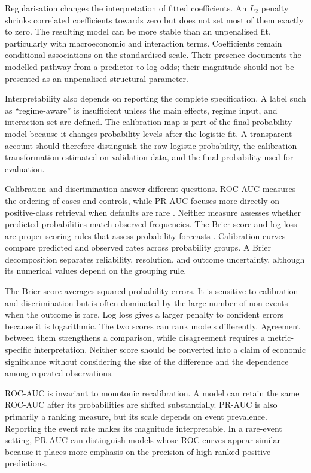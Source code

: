 Regularisation changes the interpretation of fitted coefficients. An $L_2$ penalty shrinks correlated coefficients towards zero but does not set most of them exactly to zero. The resulting model can be more stable than an unpenalised fit, particularly with macroeconomic and interaction terms. Coefficients remain conditional associations on the standardised scale. Their presence documents the modelled pathway from a predictor to log-odds; their magnitude should not be presented as an unpenalised structural parameter.

Interpretability also depends on reporting the complete specification. A label such as ``regime-aware'' is insufficient unless the main effects, regime input, and interaction set are defined. The calibration map is part of the final probability model because it changes probability levels after the logistic fit. A transparent account should therefore distinguish the raw logistic probability, the calibration transformation estimated on validation data, and the final probability used for evaluation.

Calibration and discrimination answer different questions. ROC-AUC measures the ordering of cases and controls, while PR-AUC focuses more directly on positive-class retrieval when defaults are rare \citep{davis_goadrich_2006,saito2015prroc}. Neither measure assesses whether predicted probabilities match observed frequencies. The Brier score and log loss are proper scoring rules that assess probability forecasts \citep{brier1950,gneiting_raftery_2007}. Calibration curves compare predicted and observed rates across probability groups. A Brier decomposition separates reliability, resolution, and outcome uncertainty, although its numerical values depend on the grouping rule.

The Brier score averages squared probability errors. It is sensitive to calibration and discrimination but is often dominated by the large number of non-events when the outcome is rare. Log loss gives a larger penalty to confident errors because it is logarithmic. The two scores can rank models differently. Agreement between them strengthens a comparison, while disagreement requires a metric-specific interpretation. Neither score should be converted into a claim of economic significance without considering the size of the difference and the dependence among repeated observations.

ROC-AUC is invariant to monotonic recalibration. A model can retain the same ROC-AUC after its probabilities are shifted substantially. PR-AUC is also primarily a ranking measure, but its scale depends on event prevalence. Reporting the event rate makes its magnitude interpretable. In a rare-event setting, PR-AUC can distinguish models whose ROC curves appear similar because it places more emphasis on the precision of high-ranked positive predictions.

